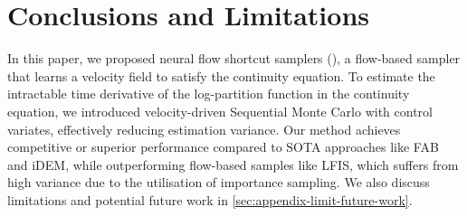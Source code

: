 \section{Conclusions and Limitations}
In this paper, we proposed neural flow shortcut samplers (\ours), a flow-based sampler that learns a velocity field to satisfy the continuity equation.
To estimate the intractable time derivative of the log-partition function in the continuity equation, we introduced velocity-driven Sequential Monte Carlo with control variates, effectively reducing estimation variance.
Our method achieves competitive or superior performance compared to SOTA approaches like FAB and iDEM, while outperforming flow-based samples like LFIS, which suffers from high variance due to the utilisation of importance sampling.
We also discuss limitations and potential future work in \cref{sec:appendix-limit-future-work}.